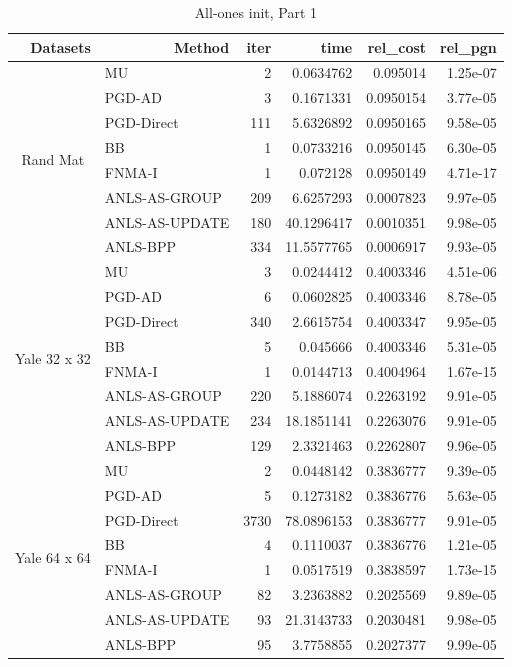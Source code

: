 \documentclass[conference,onecolumn,12pt]{IEEEtran}
\numberwithin{equation}{section}
\numberwithin{figure}{section}
\numberwithin{table}{section}
\theoremstyle{definition}
\begin{document}
\begin{table}[htbp]
	\centering
	\caption{All-ones init, Part 1}
	  \begin{tabular}{clrrrr}
		\toprule
	  \multicolumn{1}{r}{Datasets} & \multicolumn{1}{r}{Method} & iter  & time  & rel\_cost & rel\_pgn \\
	  \midrule
	  \multirow{8}[0]{*}{Rand Mat} & MU    & 2     & 0.0634762 & 0.095014 & 1.25e-07 \\
			& PGD-AD & 3     & 0.1671331 & 0.0950154 & 3.77e-05 \\
			& PGD-Direct & 111   & 5.6326892 & 0.0950165 & 9.58e-05 \\
			& BB    & 1     & 0.0733216 & 0.0950145 & 6.30e-05 \\
			& FNMA-I & 1     & 0.072128 & 0.0950149 & 4.71e-17 \\
			& ANLS-AS-GROUP & 209   & 6.6257293 & 0.0007823 & 9.97e-05 \\
			& ANLS-AS-UPDATE & 180   & 40.1296417 & 0.0010351 & 9.98e-05 \\
			& ANLS-BPP & 334   & 11.5577765 & 0.0006917 & 9.93e-05 \\
			\midrule
	  \multirow{8}[0]{*}{Yale 32 x 32} & MU    & 3     & 0.0244412 & 0.4003346 & 4.51e-06 \\
			& PGD-AD & 6     & 0.0602825 & 0.4003346 & 8.78e-05 \\
			& PGD-Direct & 340   & 2.6615754 & 0.4003347 & 9.95e-05 \\
			& BB    & 5     & 0.045666 & 0.4003346 & 5.31e-05 \\
			& FNMA-I & 1     & 0.0144713 & 0.4004964 & 1.67e-15 \\
			& ANLS-AS-GROUP & 220   & 5.1886074 & 0.2263192 & 9.91e-05 \\
			& ANLS-AS-UPDATE & 234   & 18.1851141 & 0.2263076 & 9.91e-05 \\
			& ANLS-BPP & 129   & 2.3321463 & 0.2262807 & 9.96e-05 \\
			\midrule
	  \multirow{8}[0]{*}{Yale 64 x 64} & MU    & 2     & 0.0448142 & 0.3836777 & 9.39e-05 \\
			& PGD-AD & 5     & 0.1273182 & 0.3836776 & 5.63e-05 \\
			& PGD-Direct & 3730  & 78.0896153 & 0.3836777 & 9.91e-05 \\
			& BB    & 4     & 0.1110037 & 0.3836776 & 1.21e-05 \\
			& FNMA-I & 1     & 0.0517519 & 0.3838597 & 1.73e-15 \\
			& ANLS-AS-GROUP & 82    & 3.2363882 & 0.2025569 & 9.89e-05 \\
			& ANLS-AS-UPDATE & 93    & 21.3143733 & 0.2030481 & 9.98e-05 \\
			& ANLS-BPP & 95    & 3.7758855 & 0.2027377 & 9.99e-05 \\
			\bottomrule
	  \end{tabular}%
	\label{tab:addlabel}%
  \end{table}%
\end{document}
